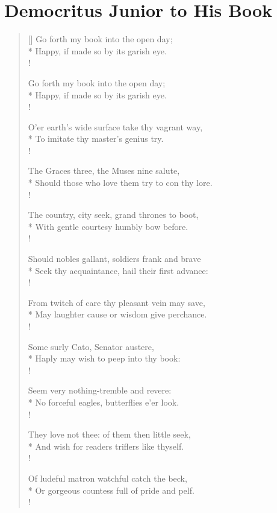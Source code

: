 \chapter{Democritus Junior to His Book}
\settowidth{\versewidth}{Should known or unknown student, freed from strife}
\begin{verse}[\versewidth]
Go forth my book into the open day;\\*
Happy, if made so by its garish eye. \\!

Go forth my book into the open day;\\*
Happy, if made so by its garish eye. \\!

O'er earth's wide surface take thy vagrant way,\\*
To imitate thy master's genius try. \\!

The Graces three, the Muses nine salute,\\*
Should those who love them try to con thy lore.\\!

The country, city seek, grand thrones to boot,\\*
With gentle courtesy humbly bow before.\\!

Should nobles gallant, soldiers frank and brave\\*
Seek thy acquaintance, hail their first advance:\\!

From twitch of care thy pleasant vein may save,\\*
May laughter cause or wisdom give perchance.\\!

Some surly Cato, Senator austere,\\*
Haply may wish to peep into thy book:\\!

Seem very nothing-tremble and revere:\\*
No forceful eagles, butterflies e'er look.\\!

They love not thee: of them then little seek,\\*
And wish for readers triflers like thyself.\\!

Of ludeful matron watchful catch the beck,\\*
Or gorgeous countess full of pride and pelf.\\!


\end{verse}
